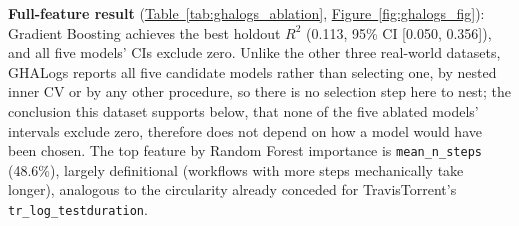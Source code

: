 \documentclass[technologies,article,submit,pdftex,moreauthors]{Definitions/mdpi}
\begin{document}
\textbf{Full-feature result} (\hyperref[tab:ghalogs_ablation]{Table~\ref*{tab:ghalogs_ablation}}, \hyperref[fig:ghalogs_fig]{Figure~\ref*{fig:ghalogs_fig}}): Gradient Boosting achieves the best holdout \(R^2\) (0.113, 95\% CI {[}0.050, 0.356{]}), and all five models' CIs exclude zero. Unlike the other three real-world datasets, GHALogs reports all five candidate models rather than selecting one, by nested inner CV or by any other procedure, so there is no selection step here to nest; the conclusion this dataset supports below, that none of the five ablated models' intervals exclude zero, therefore does not depend on how a model would have been chosen. The top feature by Random Forest importance is \texttt{mean\_n\_steps} (48.6\%), largely definitional (workflows with more steps mechanically take longer), analogous to the circularity already conceded for TravisTorrent's \texttt{tr\_log\_testduration}.
\end{document}
